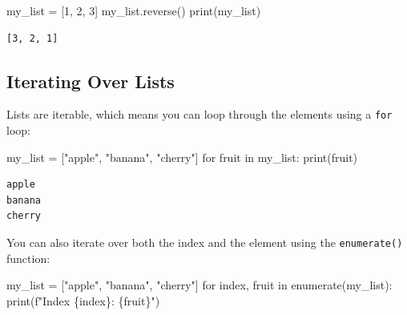 \documentclass[
  letterpaper,
  DIV=11,
  numbers=noendperiod]{scrreprt}
\newenvironment{Shaded}{\begin{snugshade}}{\end{snugshade}}
\newcommand{\BuiltInTok}[1]{\textcolor[rgb]{0.00,0.23,0.31}{#1}}
\newcommand{\ControlFlowTok}[1]{\textcolor[rgb]{0.00,0.23,0.31}{#1}}
\newcommand{\DecValTok}[1]{\textcolor[rgb]{0.68,0.00,0.00}{#1}}
\newcommand{\KeywordTok}[1]{\textcolor[rgb]{0.00,0.23,0.31}{#1}}
\newcommand{\NormalTok}[1]{\textcolor[rgb]{0.00,0.23,0.31}{#1}}
\newcommand{\OperatorTok}[1]{\textcolor[rgb]{0.37,0.37,0.37}{#1}}
\newcommand{\SpecialCharTok}[1]{\textcolor[rgb]{0.37,0.37,0.37}{#1}}
\newcommand{\SpecialStringTok}[1]{\textcolor[rgb]{0.13,0.47,0.30}{#1}}
\newcommand{\StringTok}[1]{\textcolor[rgb]{0.13,0.47,0.30}{#1}}
\begin{document}
\begin{enumerate}
\begin{Shaded}
\begin{Highlighting}[]
\NormalTok{my\_list }\OperatorTok{=}\NormalTok{ [}\DecValTok{1}\NormalTok{, }\DecValTok{2}\NormalTok{, }\DecValTok{3}\NormalTok{]}
\NormalTok{my\_list.reverse()}
\BuiltInTok{print}\NormalTok{(my\_list) }
\end{Highlighting}
\end{Shaded}

\begin{verbatim}
[3, 2, 1]
\end{verbatim}
\end{enumerate}

\hypertarget{iterating-over-lists}{%
\subsection{Iterating Over Lists}\label{iterating-over-lists}}

Lists are iterable, which means you can loop through the elements using
a \texttt{for} loop:

\begin{Shaded}
\begin{Highlighting}[]
\NormalTok{my\_list }\OperatorTok{=}\NormalTok{ [}\StringTok{"apple"}\NormalTok{, }\StringTok{"banana"}\NormalTok{, }\StringTok{"cherry"}\NormalTok{]}
\ControlFlowTok{for}\NormalTok{ fruit }\KeywordTok{in}\NormalTok{ my\_list:}
    \BuiltInTok{print}\NormalTok{(fruit)}
\end{Highlighting}
\end{Shaded}

\begin{verbatim}
apple
banana
cherry
\end{verbatim}

You can also iterate over both the index and the element using the
\texttt{enumerate()} function:

\begin{Shaded}
\begin{Highlighting}[]
\NormalTok{my\_list }\OperatorTok{=}\NormalTok{ [}\StringTok{"apple"}\NormalTok{, }\StringTok{"banana"}\NormalTok{, }\StringTok{"cherry"}\NormalTok{]}
\ControlFlowTok{for}\NormalTok{ index, fruit }\KeywordTok{in} \BuiltInTok{enumerate}\NormalTok{(my\_list):}
    \BuiltInTok{print}\NormalTok{(}\SpecialStringTok{f"Index }\SpecialCharTok{\{}\NormalTok{index}\SpecialCharTok{\}}\SpecialStringTok{: }\SpecialCharTok{\{}\NormalTok{fruit}\SpecialCharTok{\}}\SpecialStringTok{"}\NormalTok{)}
\end{Highlighting}
\end{Shaded}
\end{document}
